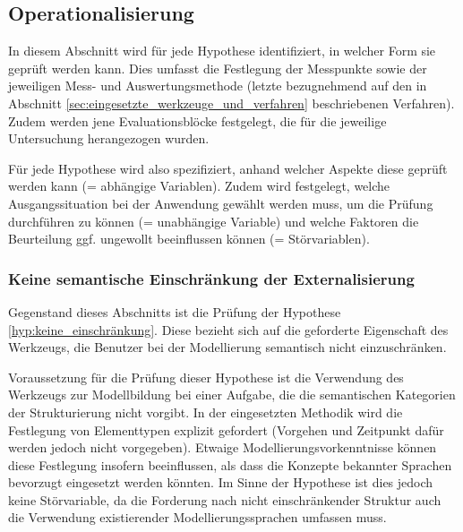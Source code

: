 \subsection{Operationalisierung} %
\label{sub:m_operationalisierung}

In diesem Abschnitt wird für jede Hypothese identifiziert, in welcher Form sie geprüft werden kann. Dies umfasst die Festlegung der Messpunkte sowie der jeweiligen Mess- und Auswertungsmethode (letzte bezugnehmend auf den in Abschnitt \ref{sec:eingesetzte_werkzeuge_und_verfahren} beschriebenen Verfahren). Zudem werden jene Evaluationsblöcke festgelegt, die für die jeweilige Untersuchung herangezogen wurden.

Für jede Hypothese wird also spezifiziert, anhand welcher Aspekte diese geprüft werden kann (= abhängige Variablen). Zudem wird festgelegt, welche Ausgangssituation bei der Anwendung gewählt werden muss, um die Prüfung durchführen zu können (= unabhängige Variable) und welche Faktoren die Beurteilung ggf. ungewollt beeinflussen können (= Störvariablen).

\subsubsection{Keine semantische Einschränkung der Externalisierung} %
\label{ssub:keine_semantische_einschränkung_der_externalisierung}

Gegenstand dieses Abschnitts ist die Prüfung der Hypothese \ref{hyp:keine_einschränkung}. Diese bezieht sich auf die geforderte Eigenschaft des Werkzeugs, die Benutzer bei der Modellierung semantisch nicht einzuschränken.

Voraussetzung für die Prüfung dieser Hypothese ist die Verwendung des Werkzeugs zur Modellbildung bei einer Aufgabe, die die semantischen Kategorien der Strukturierung nicht vorgibt. In der eingesetzten Methodik wird die Festlegung von Elementtypen explizit gefordert (Vorgehen und Zeitpunkt dafür werden jedoch nicht vorgegeben). Etwaige Modellierungsvorkenntnisse können diese Festlegung insofern beeinflussen, als dass die Konzepte bekannter Sprachen bevorzugt eingesetzt werden könnten. Im Sinne der Hypothese ist dies jedoch keine Störvariable, da die Forderung nach nicht einschränkender Struktur auch die Verwendung existierender Modellierungssprachen umfassen muss.

